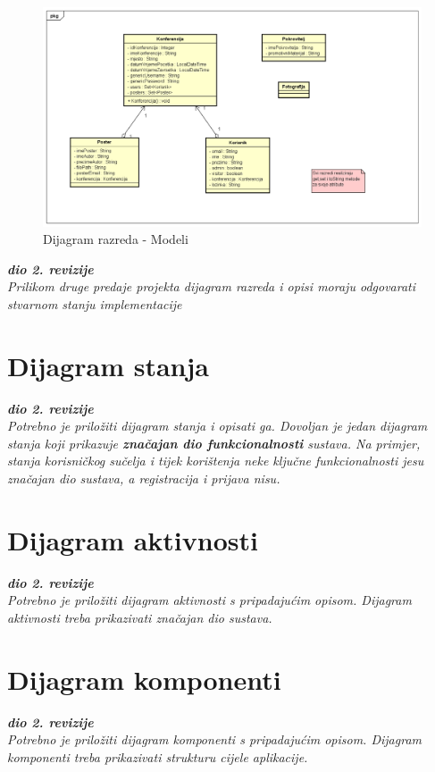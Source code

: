 			\begin{figure} [hbt!]
				\includegraphics[width=\linewidth]{Slike/ClassDiagramModelPremaKodu}
				\caption{Dijagram razreda - Modeli}
			\end{figure}
			
			\clearpage
			 
			\textbf{\textit{dio 2. revizije}}\\			
			
			\textit{Prilikom druge predaje projekta dijagram razreda i opisi moraju odgovarati stvarnom stanju implementacije}
			
			
			
			\eject
		
		\section{Dijagram stanja}
			
			
			\textbf{\textit{dio 2. revizije}}\\
			
			\textit{Potrebno je priložiti dijagram stanja i opisati ga. Dovoljan je jedan dijagram stanja koji prikazuje \textbf{značajan dio funkcionalnosti} sustava. Na primjer, stanja korisničkog sučelja i tijek korištenja neke ključne funkcionalnosti jesu značajan dio sustava, a registracija i prijava nisu. }
			
			
			\eject 
		
		\section{Dijagram aktivnosti}
			
			\textbf{\textit{dio 2. revizije}}\\
			
			 \textit{Potrebno je priložiti dijagram aktivnosti s pripadajućim opisom. Dijagram aktivnosti treba prikazivati značajan dio sustava.}
			
			\eject
		\section{Dijagram komponenti}
		
			\textbf{\textit{dio 2. revizije}}\\
		
			 \textit{Potrebno je priložiti dijagram komponenti s pripadajućim opisom. Dijagram komponenti treba prikazivati strukturu cijele aplikacije.}